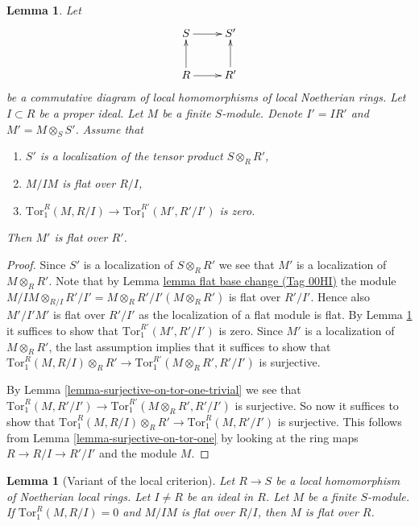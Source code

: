 \documentclass{amsart}
\theoremstyle{plain}
\newtheorem{lemma}[subsection]{Lemma}
\theoremstyle{definition}
\theoremstyle{remark}
\numberwithin{equation}{subsection}
\begin{document}
\begin{lemma}
\label{lemma-another-variant-local-criterion-flatness}
Let
$$
\xymatrix{
S \ar[r] & S' \\
R \ar[r] \ar[u] & R' \ar[u]
}
$$
be a commutative diagram of local homomorphisms of local Noetherian rings.
Let $I \subset R$ be a proper ideal.
Let $M$ be a finite $S$-module.
Denote $I' = IR'$ and $M' = M \otimes_S S'$.
Assume that
\begin{enumerate}
\item $S'$ is a localization of the tensor product
$S \otimes_R R'$,
\item $M/IM$ is flat over $R/I$,
\item $\text{Tor}_1^R(M, R/I) \to \text{Tor}_1^{R'}(M', R'/I')$
is zero.
\end{enumerate}
Then $M'$ is flat over $R'$.
\end{lemma}

\begin{proof}
Since $S'$ is a localization of $S \otimes_R R'$ we see that
$M'$ is a localization of $M \otimes_R R'$. Note that
by Lemma \href{https://stacks.math.columbia.edu/tag/00HI}{lemma flat base change (Tag 00HI)} the module $M/IM \otimes_{R/I} R'/I'
= M \otimes_R R' /I'(M \otimes_R R')$ is flat over $R'/I'$. Hence also
$M'/I'M'$ is flat over $R'/I'$ as the localization of a flat module
is flat. By Lemma \ref{lemma-variant-local-criterion-flatness}
it suffices to show that $\text{Tor}_1^{R'}(M', R'/I')$ is zero.
Since $M'$ is a localization of $M \otimes_R R'$, the last assumption
implies that it suffices to show that
$\text{Tor}_1^R(M, R/I) \otimes_R R'
\to
\text{Tor}_1^{R'}(M \otimes_R R', R'/I')$
is surjective.

\medskip\noindent
By Lemma \ref{lemma-surjective-on-tor-one-trivial} we see that
$\text{Tor}_1^R(M, R'/I') \to \text{Tor}_1^{R'}(M \otimes_R R', R'/I')$
is surjective. So now it suffices to show that
$\text{Tor}_1^R(M, R/I) \otimes_R R'
\to
\text{Tor}_1^R(M, R'/I')$
is surjective. This follows from Lemma \ref{lemma-surjective-on-tor-one}
by looking at the ring maps $R \to R/I \to R'/I'$ and the module $M$.
\end{proof}


\begin{lemma}[Variant of the local criterion]
\label{lemma-variant-local-criterion-flatness}
Let $R \to S$ be a local homomorphism of Noetherian
local rings. Let $I \not = R$ be an ideal in $R$.
Let $M$ be a finite $S$-module. If $\text{Tor}_1^R(M, R/I) = 0$
and $M/IM$ is flat over $R/I$, then $M$ is flat over $R$.
\end{lemma}
\end{document}
